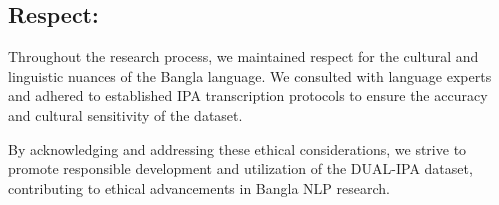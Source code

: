 \subsection{Respect:} Throughout the research process, we maintained respect for the cultural and linguistic nuances of the Bangla language. We consulted with language experts and adhered to established IPA transcription protocols to ensure the accuracy and cultural sensitivity of the dataset.

By acknowledging and addressing these ethical considerations, we strive to promote responsible development and utilization of the DUAL-IPA dataset, contributing to ethical advancements in Bangla NLP research.